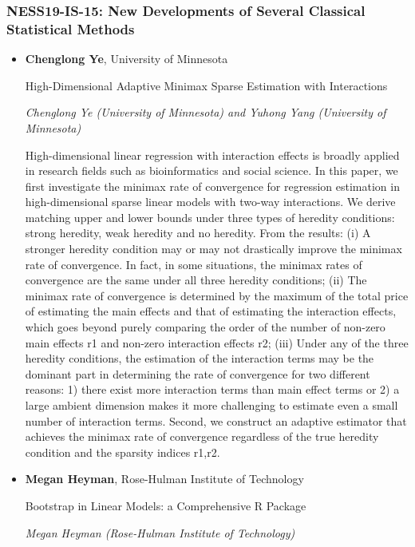 \subsubsection*{NESS19-IS-15: New Developments of Several Classical Statistical Methods}

\begin{itemize}
\item \textbf{Chenglong Ye}, University of Minnesota

High-Dimensional Adaptive Minimax Sparse Estimation with Interactions

\emph{\footnotesize Chenglong Ye (University of Minnesota) and Yuhong Yang (University of Minnesota)}

High-dimensional linear regression with interaction effects is broadly applied in research fields such as bioinformatics and social science. In this paper, we first investigate the minimax rate of convergence for regression estimation in high-dimensional sparse linear models with two-way interactions. We derive matching upper and lower bounds under three types of heredity conditions: strong heredity, weak heredity and no heredity. From the results: (i) A stronger heredity condition may or may not drastically improve the minimax rate of convergence. In fact, in some situations, the minimax rates of convergence are the same under all three heredity conditions; (ii) The minimax rate of convergence is determined by the maximum of the total price of estimating the main effects and that of estimating the interaction effects, which goes beyond purely comparing the order of the number of non-zero main effects r1 and non-zero interaction effects r2; (iii) Under any of the three heredity conditions, the estimation of the interaction terms may be the dominant part in determining the rate of convergence for two different reasons: 1) there exist more interaction terms than main effect terms or 2) a large ambient dimension makes it more challenging to estimate even a small number of interaction terms. Second, we construct an adaptive estimator that achieves the minimax rate of convergence regardless of the true heredity condition and the sparsity indices r1,r2.

\item \textbf{Megan Heyman}, Rose-Hulman Institute of Technology

Bootstrap in Linear Models:  a Comprehensive R Package

\emph{\footnotesize Megan Heyman (Rose-Hulman Institute of Technology)}


\end{itemize}
